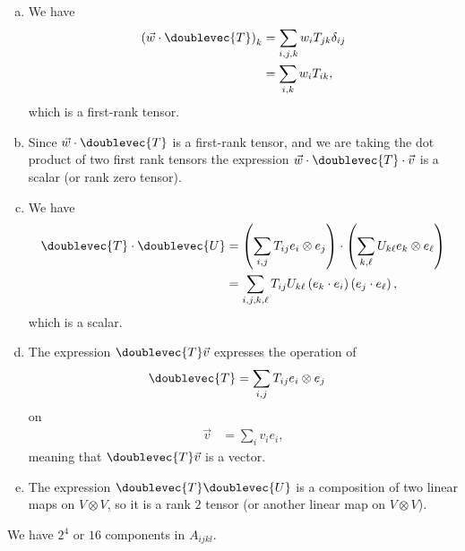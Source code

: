 \documentclass[10pt]{mypackage}
\begin{document}
\RaggedRight
\begin{solution}[29.5]\hfill
  \begin{enumerate}[(a)]
    \item We have
      \begin{align*}
        \left( \vec{w}\cdot \doublevec{T} \right)_{k} &= \sum_{i,j,k}w_{i}T_{jk}\delta_{ij}\\
                                   &= \sum_{i,k}w_iT_{ik},
      \end{align*}
      which is a first-rank tensor.
    \item Since $\vec{w}\cdot \doublevec{T}$ is a first-rank tensor, and we are taking the dot product of two first rank tensors the expression $\vec{w}\cdot \doublevec{T}\cdot \vec{v}$ is a scalar (or rank zero tensor).
    \item We have
      \begin{align*}
        \doublevec{T}\cdot \doublevec{U} &= \left( \sum_{i,j}T_{ij}e_i\otimes e_j \right)\cdot \left( \sum_{k,\ell}U_{k\ell} e_{k}\otimes e_{\ell} \right)\\
                                         &= \sum_{i,j,k,\ell}T_{ij}U_{k \ell} \left( e_k\cdot e_i \right)\left( e_j\cdot e_{\ell} \right),
      \end{align*}
      which is a scalar.
    \item The expression $\doublevec{T}\vec{v}$ expresses the operation of
      \begin{align*}
        \doublevec{T} &= \sum_{i,j}T_{ij}e_i\otimes e_j
      \end{align*}
      on
      \begin{align*}
        \vec{v} &= \sum_{i}v_ie_i,
      \end{align*}
      meaning that $\doublevec{T}\vec{v}$ is a vector.
    \item The expression $\doublevec{T}\doublevec{U}$ is a composition of two linear maps on $V\otimes V$, so it is a rank $2$ tensor (or another linear map on $V\otimes V$).
  \end{enumerate}
\end{solution}
\begin{solution}[29.7]
  We have $2^{4}$ or $16$ components in $A_{ijkl}$.
\end{solution}
\begin{solution}[29.10]

\end{solution}
\begin{solution}[29.11]\hfill
\end{solution}
\begin{enumerate}[(a)]

\end{enumerate}
\begin{solution}[29.12]

\end{solution}
\begin{solution}[29.14]

\end{solution}
\begin{solution}[29.23]

\end{solution}
\begin{solution}[29.24]

\end{solution}
\begin{solution}[29.25]

\end{solution}
\end{document}
